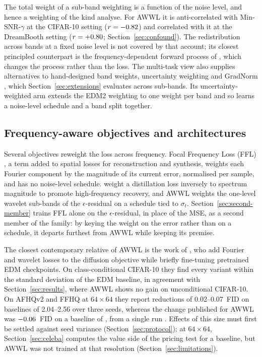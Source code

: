 The total weight of a sub-band weighting is a function of the noise level, and
hence a weighting of the kind \citet{kingma2023understanding} analyse. For
AWWL \citep{thao2026awwl} it is anti-correlated with Min-SNR-$\gamma$ at the
CIFAR-10 setting ($r = -0.82$) and correlated with it at the
DreamBooth setting ($r = +0.80$; Section~\ref{sec:confound}). The
redistribution across bands at a fixed noise level is not covered by that
account; its closest principled counterpart is the frequency-dependent forward
process of \citet{hoogeboom2023blurring}, which changes the process rather
than the loss. The multi-task view also supplies alternatives to hand-designed
band weights, uncertainty weighting \citep{kendall2018multi} and GradNorm
\citep{chen2018gradnorm}, which Section~\ref{sec:extensions} evaluates across
sub-bands. Its uncertainty-weighted arm extends the EDM2 weighting to one
weight per band and so learns a noise-level schedule and a band split
together.

\subsection{Frequency-aware objectives and architectures}
\label{sec:related-objectives}

Several objectives reweight the loss across frequency. Focal Frequency Loss
(FFL) \citep{jiang2021focal}, a term added to spatial losses for
reconstruction and synthesis, weights each Fourier component by the magnitude
of its current error, normalised per sample, and has no noise-level schedule.
\citet{yang2023diffusion} weight a distillation loss inversely to spectrum
magnitude to promote high-frequency recovery, and AWWL weights the one-level
wavelet sub-bands of the $\epsilon$-residual on a schedule tied to $\sigma_t$.
Section~\ref{sec:second-member} trains FFL alone on the $\epsilon$-residual,
in place of the MSE, as a second member of the family: by keying the weight on
the error rather than on a schedule, it departs furthest from AWWL while
keeping its premise.

The closest contemporary relative of AWWL is the work of
\citet{chandran2026spectral}, who add Fourier and wavelet losses to the
diffusion objective while briefly fine-tuning pretrained EDM checkpoints. On
class-conditional CIFAR-10 they find every variant within the standard
deviation of the EDM baseline, in agreement with Section~\ref{sec:results},
where AWWL shows no gain on unconditional CIFAR-10. On AFHQv2 and
FFHQ at $64\times64$ they report reductions of \numrange{0.02}{0.07}~FID on
baselines of \numrange{2.04}{2.56} over three seeds, whereas the change
published for AWWL was $-0.06$~FID on a baseline of \pubFIDMSE{}, from
a single run \citep{thao2026awwl}. Effects of this size must first be settled
against seed variance (Section~\ref{sec:protocol}); at $64\times64$,
Section~\ref{sec:celeba} computes the value side of the pricing test for a
baseline, but AWWL was not trained at that resolution
(Section~\ref{sec:limitations}).

